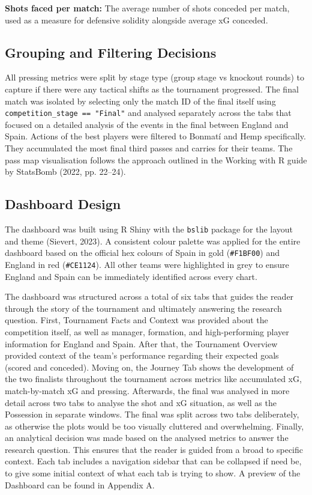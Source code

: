\documentclass[
  11pt,
  a4paper,
  DIV=11,
  numbers=noendperiod]{scrartcl}
\begin{document}
\textbf{Shots faced per match:} The average number of shots conceded per
match, used as a measure for defensive solidity alongside average xG
conceded.

\subsection{Grouping and Filtering
Decisions}\label{grouping-and-filtering-decisions}

All pressing metrics were split by stage type (group stage vs knockout
rounds) to capture if there were any tactical shifts as the tournament
progressed. The final match was isolated by selecting only the match ID
of the final itself using \texttt{competition\_stage\ ==\ "Final"} and
analysed separately across the tabs that focused on a detailed analysis
of the events in the final between England and Spain. Actions of the
best players were filtered to Bonmatí and Hemp specifically. They
accumulated the most final third passes and carries for their teams. The
pass map visualisation follows the approach outlined in the Working with
R guide by StatsBomb (2022, pp. 22--24).

\subsection{Dashboard Design}\label{dashboard-design}

The dashboard was built using R Shiny with the \texttt{bslib} package
for the layout and theme (Sievert, 2023). A consistent colour palette
was applied for the entire dashboard based on the official hex colours
of Spain in gold (\texttt{\#F1BF00}) and England in red
(\texttt{\#CE1124}). All other teams were highlighted in grey to ensure
England and Spain can be immediately identified across every chart.

The dashboard was structured across a total of six tabs that guides the
reader through the story of the tournament and ultimately answering the
research question. First, Tournament Facts and Context was provided
about the competition itself, as well as manager, formation, and
high-performing player information for England and Spain. After that,
the Tournament Overview provided context of the team's performance
regarding their expected goals (scored and conceded). Moving on, the
Journey Tab shows the development of the two finalists throughout the
tournament across metrics like accumulated xG, match-by-match xG and
pressing. Afterwards, the final was analysed in more detail across two
tabs to analyse the shot and xG situation, as well as the Possession in
separate windows. The final was split across two tabs deliberately, as
otherwise the plots would be too visually cluttered and overwhelming.
Finally, an analytical decision was made based on the analysed metrics
to answer the research question. This ensures that the reader is guided
from a broad to specific context. Each tab includes a navigation sidebar
that can be collapsed if need be, to give some initial context of what
each tab is trying to show. A preview of the Dashboard can be found in
Appendix A.
\end{document}
